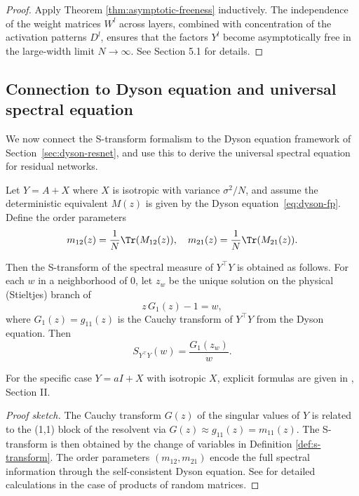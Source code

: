\begin{proof}
Apply Theorem \ref{thm:asymptotic-freeness} inductively. The independence of the weight matrices $W^l$ across layers, combined with concentration of the activation patterns $D^l$, ensures that the factors $Y^l$ become asymptotically free in the large-width limit $N \to \infty$. See Section 5.1 for details.
\end{proof}

\subsection{Connection to Dyson equation and universal spectral equation}

We now connect the S-transform formalism to the Dyson equation framework of Section~\ref{sec:dyson-resnet}, and use this to derive the universal spectral equation for residual networks.

\begin{proposition}\label{prop:s-from-dyson}
Let $Y = A + X$ where $X$ is isotropic with variance $\sigma^2/N$, and assume the deterministic equivalent $M(z)$ is given by the Dyson equation~\eqref{eq:dyson-fp}. Define the order parameters
\begin{equation}
m_{12}(z) = \frac{1}{N}\Tr(M_{12}(z)), \quad m_{21}(z) = \frac{1}{N}\Tr(M_{21}(z)).
\end{equation}

Then the S-transform of the spectral measure of $Y^\top Y$ is obtained as follows. For each $w$ in a neighborhood of $0$, let $z_w$ be the unique solution on the physical (Stieltjes) branch of
\begin{equation}\label{eq:psi-inversion-scalar}
z \, G_1(z) - 1 = w,
\end{equation}
where $G_1(z) = g_{11}(z)$ is the Cauchy transform of $Y^\top Y$ from the Dyson equation. Then
\begin{equation}\label{eq:s-from-order-params}
S_{Y^\top Y}(w) = \frac{G_1(z_w)}{w}.
\end{equation}

For the specific case $Y = aI + X$ with isotropic $X$, explicit formulas are given in \cite{tarnowski2019dynamical}, Section II.
\end{proposition}

\begin{proof}[Proof sketch]
The Cauchy transform $G(z)$ of the singular values of $Y$ is related to the (1,1) block of the resolvent via $G(z) \approx g_{11}(z) = m_{11}(z)$. The S-transform is then obtained by the change of variables in Definition \ref{def:s-transform}. The order parameters $(m_{12}, m_{21})$ encode the full spectral information through the self-consistent Dyson equation. See \cite{burda2010free} for detailed calculations in the case of products of random matrices.
\end{proof}

